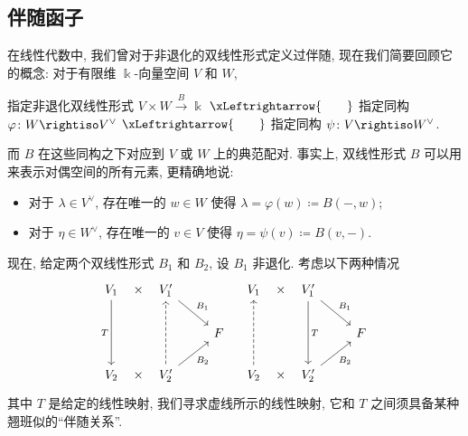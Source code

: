 \subsection{伴随函子}
在线性代数中, 我们曾对于非退化的双线性形式定义过伴随\cite[$\S 8.2$]{李文威线代}, 现在我们简要回顾它的概念:
对于有限维 $\Bbbk$-向量空间 $V$ 和 $W$,
\begin{center}
    指定非退化双线性形式 $V \times W \xrightarrow{B}\Bbbk$ $\xLeftrightarrow{\qquad}$ 指定同构 $\varphi \colon W \rightiso V^{\vee}$ $\xLeftrightarrow{\qquad}$ 指定同构 $\psi \colon V \rightiso W^{\vee}$.
\end{center}
而 $B$ 在这些同构之下对应到 $V$ 或 $W$ 上的典范配对. 事实上, 双线性形式 $B$ 可以用来表示对偶空间的所有元素, 更精确地说:
\begin{itemize}
    \item 对于 $\lambda \in V^{\vee}$, 存在唯一的 $w \in W$ 使得 $\lambda = \varphi(w) \coloneqq B(-,w)$;
    \item 对于 $\eta \in W^{\vee}$, 存在唯一的 $v \in V$ 使得 $\eta = \psi(v) \coloneqq B(v,-)$.
\end{itemize}
现在, 给定两个双线性形式 $B_1$ 和 $B_2$, 设 $B_1$ 非退化. 考虑以下两种情况
\[\begin{tikzcd}
	{V_1} & {V_1'} \\
	&& F \\
	{V_2} & {V_2'}
	\arrow["\times"{marking, allow upside down}, draw=none, from=1-1, to=1-2]
	\arrow["T"', from=1-1, to=3-1]
	\arrow["{B_1}", from=1-2, to=2-3]
	\arrow["\times"{marking, allow upside down}, draw=none, from=3-1, to=3-2]
	\arrow[dashed, from=3-2, to=1-2]
	\arrow["{B_2}"', from=3-2, to=2-3]
\end{tikzcd} \quad 
\begin{tikzcd}
	{V_1} & {V_1'} \\
	&& F \\
	{V_2} & {V_2'}
	\arrow["\times"{marking, allow upside down}, draw=none, from=1-1, to=1-2]
	\arrow["{B_1}", from=1-2, to=2-3]
	\arrow["T", from=1-2, to=3-2]
	\arrow[dashed, from=3-1, to=1-1]
	\arrow["\times"{marking, allow upside down}, draw=none, from=3-1, to=3-2]
	\arrow["{B_2}"', from=3-2, to=2-3]
\end{tikzcd}\]
其中 $T$ 是给定的线性映射, 我们寻求虚线所示的线性映射, 它和 $T$ 之间须具备某种翘班似的``伴随关系''.
